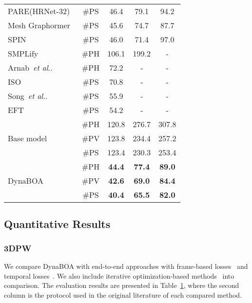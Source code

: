 \documentclass[10pt,journal,compsoc]{IEEEtran}
\makeatletter
\DeclareRobustCommand\onedot{\futurelet\@let@token\@onedot}
\def\@onedot{\ifx\@let@token.\else.\null\fi\xspace}
\def\etal{\emph{et al}\onedot}
\newcommand{\tab}[1]{Table~\ref{#1}}
\makeatother
\begin{document}
\begin{table}[t]
\begin{tabular}{lcccc}
        PARE(HRNet-32)~\cite{kocabas2021pare}             &\#PS       &46.4                   &79.1 &94.2 \\
        Mesh Graphormer~\cite{lin2021-mesh-graphormer}    &\#PS       &45.6                   &74.7  &87.7 \\
        SPIN~\cite{kolotouros2019learning}                &\#PS       &46.0                   &71.4   &97.0   \\
\midrule
SMPLify~\cite{bogo2016keep}                             &\#PH       &106.1                  &199.2 &- \\
        Arnab~\etal~\cite{arnab2019exploiting}                  &\#PH       &72.2                   &-    &-  \\
        ISO~\cite{zhang2020inference}                           &\#PS       &70.8                   &-  &-\\
        Song~\etal~\cite{song2020human}                         &\#PS          &55.9                   &- &- \\
        EFT~\cite{joo2020eft}                                   &\#PS       &54.2                   &-      &-\\
    \midrule
        \multirow{3}{*}{Base model}  &\#PH &120.8                  &276.7 &307.8 \\
        &\#PV       &123.8                  &234.4 &257.2     \\
        &\#PS       &123.4                  &230.3 &253.4     \\
    \midrule
        \multirow{3}{*}{DynaBOA} 
        &\#PH       &\textbf{44.4}                   &\textbf{77.4} &\textbf{89.0}     \\
        &\#PV       &\textbf{42.6}                  &\textbf{69.0} &\textbf{84.4}     \\
        &\#PS       &\textbf{40.4} &\textbf{65.5} &\textbf{82.0}     \\
\bottomrule
\end{tabular}
\label{tab:3dpw}
\end{table}

\subsection{Quantitative Results}
\subsubsection{3DPW}


We compare DynaBOA with end-to-end approaches with frame-based losses~\cite{kanazawa2018end,DBLP:conf/nips/DoerschZ19,kolotouros2019convolutional,kolotouros2019learning,pymaf2021,Moon_2020_ECCV_I2L-MeshNet,zhang2020learning,li2021hybrik,lin2021end,lin2021-mesh-graphormer,kocabas2021pare} and temporal losses~\cite{DBLP:conf/cvpr/KanazawaZFM19,kocabas2020vibe,sun2020monocular,sun2019human}.
We also include iterative optimization-based methods~\cite{bogo2016keep,arnab2019exploiting,joo2020eft,zhang2020inference,song2020human} into comparison.
The evaluation results are presented in \tab{tab:3dpw}, where the second column is the protocol used in the original literature of each compared method. 
\end{document}

